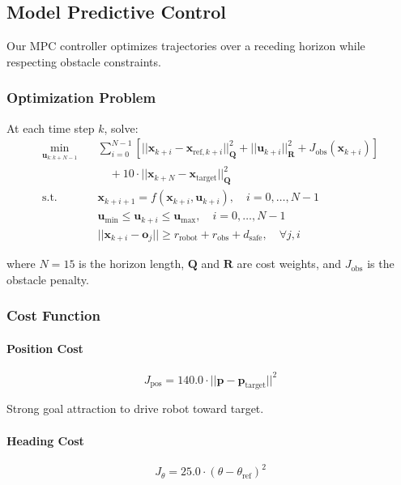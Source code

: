 \documentclass[11pt,a4paper]{article}
\begin{document}
\subsection{Model Predictive Control}

Our MPC controller optimizes trajectories over a receding horizon while respecting obstacle constraints.

\subsubsection{Optimization Problem}

At each time step $k$, solve:
\begin{align}
\min_{\mathbf{u}_{k:k+N-1}} \quad & \sum_{i=0}^{N-1} \left[ ||\mathbf{x}_{k+i} - \mathbf{x}_{\text{ref},k+i}||_{\mathbf{Q}}^2 + ||\mathbf{u}_{k+i}||_{\mathbf{R}}^2 + J_{\text{obs}}(\mathbf{x}_{k+i}) \right] \nonumber \\
& \quad + 10 \cdot ||\mathbf{x}_{k+N} - \mathbf{x}_{\text{target}}||_{\mathbf{Q}}^2 \nonumber \\
\text{s.t.} \quad & \mathbf{x}_{k+i+1} = f(\mathbf{x}_{k+i}, \mathbf{u}_{k+i}), \quad i = 0, \ldots, N-1 \nonumber \\
& \mathbf{u}_{\min} \leq \mathbf{u}_{k+i} \leq \mathbf{u}_{\max}, \quad i = 0, \ldots, N-1 \nonumber \\
& ||\mathbf{x}_{k+i} - \mathbf{o}_j|| \geq r_{\text{robot}} + r_{\text{obs}} + d_{\text{safe}}, \quad \forall j, i \nonumber
\end{align}

where $N = 15$ is the horizon length, $\mathbf{Q}$ and $\mathbf{R}$ are cost weights, and $J_{\text{obs}}$ is the obstacle penalty.

\subsubsection{Cost Function}

\paragraph{Position Cost}
\begin{equation}
J_{\text{pos}} = 140.0 \cdot ||\mathbf{p} - \mathbf{p}_{\text{target}}||^2
\end{equation}

Strong goal attraction to drive robot toward target.

\paragraph{Heading Cost}
\begin{equation}
J_{\theta} = 25.0 \cdot (\theta - \theta_{\text{ref}})^2
\end{equation}
\end{document}
